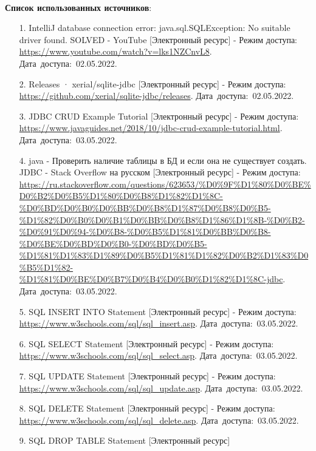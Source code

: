 \documentclass[12pt, a4paper, simple]{eskdtext}
\begin{document}
    \paragraph{} \textbf{Список использованных источников}:
    \begin{enumerate}
        \item[1.] IntelliJ database connection error: java.sql.SQLException: No suitable driver found. SOLVED - YouTube [Электронный ресурс]
        - Режим доступа: \url{https://www.youtube.com/watch?v=lks1NZCnvL8}.
        Дата~доступа:~02.05.2022.
        \item[2.] Releases · xerial/sqlite-jdbc [Электронный ресурс]
        - Режим доступа: \url{https://github.com/xerial/sqlite-jdbc/releases}.
        Дата~доступа:~02.05.2022.
        \item[3.] JDBC CRUD Example Tutorial [Электронный ресурс]
        - Режим доступа: \url{https://www.javaguides.net/2018/10/jdbc-crud-example-tutorial.html}.
        Дата~доступа:~03.05.2022.
        \item[4.] java - Проверить наличие таблицы в БД и если она не существует создать. JDBC - Stack Overflow на русском [Электронный ресурс]
        - Режим доступа: \url{https://ru.stackoverflow.com/questions/623653/%D0%9F%D1%80%D0%BE%D0%B2%D0%B5%D1%80%D0%B8%D1%82%D1%8C-%D0%BD%D0%B0%D0%BB%D0%B8%D1%87%D0%B8%D0%B5-%D1%82%D0%B0%D0%B1%D0%BB%D0%B8%D1%86%D1%8B-%D0%B2-%D0%91%D0%94-%D0%B8-%D0%B5%D1%81%D0%BB%D0%B8-%D0%BE%D0%BD%D0%B0-%D0%BD%D0%B5-%D1%81%D1%83%D1%89%D0%B5%D1%81%D1%82%D0%B2%D1%83%D0%B5%D1%82-%D1%81%D0%BE%D0%B7%D0%B4%D0%B0%D1%82%D1%8C-jdbc}.
        Дата~доступа:~03.05.2022.
        \item[5.] SQL INSERT INTO Statement [Электронный ресурс]
        - Режим доступа: \url{https://www.w3schools.com/sql/sql_insert.asp}.
        Дата~доступа:~03.05.2022.
        \item[6.] SQL SELECT Statement [Электронный ресурс]
        - Режим доступа: \url{https://www.w3schools.com/sql/sql_select.asp}.
        Дата~доступа:~03.05.2022.
        \item[7.] SQL UPDATE Statement [Электронный ресурс]
        - Режим доступа: \url{https://www.w3schools.com/sql/sql_update.asp}.
        Дата~доступа:~03.05.2022.
        \item[8.] SQL DELETE Statement [Электронный ресурс]
        - Режим доступа: \url{https://www.w3schools.com/sql/sql_delete.asp}.
        Дата~доступа:~03.05.2022.
        \item[9.] SQL DROP TABLE Statement [Электронный ресурс]

\end{enumerate}
\end{document}
